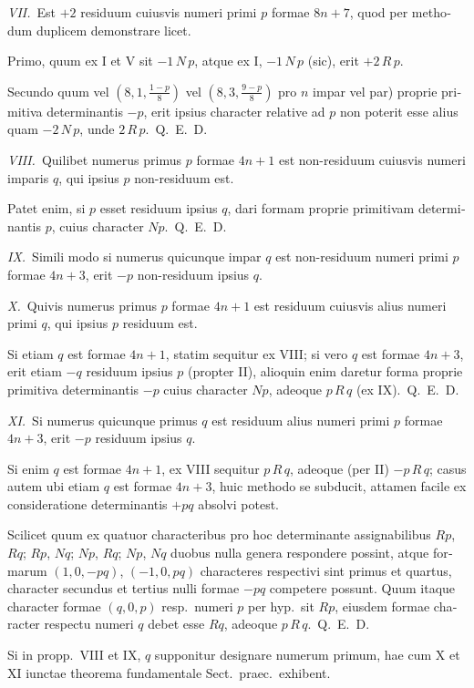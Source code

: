 \documentclass[12pt,a4paper]{article}
\theoremstyle{plain}
\theoremstyle{definition}
\theoremstyle{remark}
\begin{document}
\begin{otherlanguage}{latin}
\textit{VII.}\ Est $+2$ residuum cuiusvis numeri primi $p$ formae $8n+7$, quod per methodum duplicem demonstrare licet.

Primo, quum ex I et V sit $-1 \, N \, p$, atque ex I, $-1 \, N \, p$ (sic), erit $+2 \, R \, p$.

Secundo quum vel $(8, 1, \frac{1-p}{8})$ vel $(8, 3, \frac{9-p}{8})$ pro $n$ impar vel par) proprie primitiva determinantis $-p$, erit ipsius character relative ad $p$ non poterit esse alius quam $-2 \, N \, p$, unde $2 \, R \, p$.~\hfill Q.\ E.\ D.

\smallskip

\textit{VIII.}\ Quilibet numerus primus $p$ formae $4n+1$ est non-residuum cuiusvis numeri imparis $q$, qui ipsius $p$ non-residuum est.

Patet enim, si $p$ esset residuum ipsius $q$, dari formam proprie primitivam determinantis $p$, cuius character $Np$.~\hfill Q.\ E.\ D.

\smallskip

\textit{IX.}\ Simili modo si numerus quicunque impar $q$ est non-residuum numeri primi $p$ formae $4n+3$, erit $-p$ non-residuum ipsius $q$.

\smallskip

\textit{X.}\ Quivis numerus primus $p$ formae $4n+1$ est residuum cuiusvis alius numeri primi $q$, qui ipsius $p$ residuum est.

Si etiam $q$ est formae $4n+1$, statim sequitur ex VIII; si vero $q$ est formae $4n+3$, erit etiam $-q$ residuum ipsius $p$ (propter II), alioquin enim daretur forma proprie primitiva determinantis $-p$ cuius character $Np$, adeoque $p \, R \, q$ (ex IX).~\hfill Q.\ E.\ D.

\smallskip

\textit{XI.}\ Si numerus quicunque primus $q$ est residuum alius numeri primi $p$ formae $4n+3$, erit $-p$ residuum ipsius $q$.

Si enim $q$ est formae $4n+1$, ex VIII sequitur $p \, R \, q$, adeoque (per II) $-p \, R \, q$; casus autem ubi etiam $q$ est formae $4n+3$, huic methodo se subducit, attamen facile ex consideratione determinantis $+pq$ absolvi potest.

Scilicet quum ex quatuor characteribus pro hoc determinante assignabilibus $Rp$, $Rq$; $Rp$, $Nq$; $Np$, $Rq$; $Np$, $Nq$ duobus nulla genera respondere possint, atque formarum $(1, 0, -pq)$, $(-1, 0, pq)$ characteres respectivi sint primus et quartus, character secundus et tertius nulli formae $-pq$ competere possunt. Quum itaque character formae $(q, 0, p)$ resp.\ numeri $p$ per hyp.\ sit $Rp$, eiusdem formae character respectu numeri $q$ debet esse $Rq$, adeoque $p \, R \, q$.~\hfill Q.\ E.\ D.

Si in propp.\ VIII et IX, $q$ supponitur designare numerum primum, hae cum X et XI iunctae theorema fundamentale Sect.\ praec.\ exhibent.

\end{otherlanguage}
\end{document}
